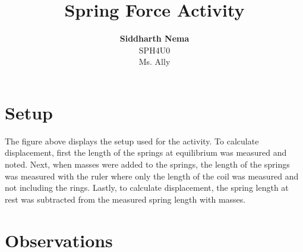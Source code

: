 \documentclass[12pt,letterpaper]{article}
\title{\textbf{Spring Force Activity}}
\author{\textbf{Siddharth Nema}\\SPH4U0 \\Ms.\hspace{-1mm} Ally}
\begin{document}
\maketitle
\newpage
\section{Setup}


The figure above displays the setup used for the activity.
To calculate displacement, first the length of the springs at equilibrium was measured and noted.
Next, when masses were added to the springs, the length of the springs was measured with the ruler where only the length of the coil was measured and not including the rings.
Lastly, to calculate displacement, the spring length at rest was subtracted from the measured spring length with masses.
\section{Observations}

\newpage
\end{document}
